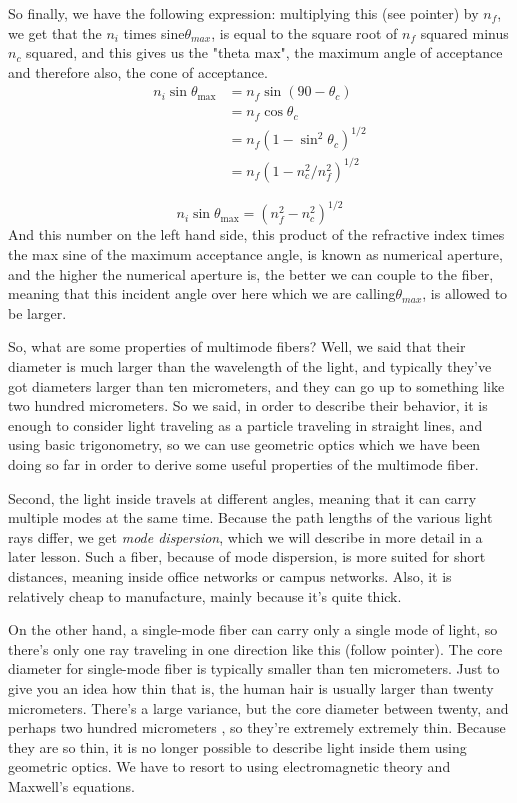 So finally, we have the following expression: multiplying this (see pointer) by $n_f$, we get that the $n_i$ times sine$\theta_{max}$, is equal to the square root of $n_f$ squared minus $n_c$ squared, and this gives us the "theta max", the maximum angle of acceptance and therefore also, the cone of acceptance.
\begin{equation}
\begin{aligned}
n_i \sin \theta_{\max } &=n_f \sin \left(90-\theta_c\right) \\
&=n_f \cos \theta_c \\
&=n_f\left(1-\sin ^2 \theta_c\right)^{1 / 2} \\
&=n_f\left(1-n_c^2 / n_f^2\right)^{1 / 2}
\end{aligned}
\end{equation}

\begin{equation}
n_i \sin \theta_{\max }=\left(n_f^2-n_c^2\right)^{1 / 2}
\end{equation}
And this number on the left hand side, this product of the refractive index times the max sine of the maximum acceptance angle, is known as numerical aperture, and the higher the numerical aperture is, the better we can couple to the fiber, meaning that this incident angle over here which we are calling$\theta_{max}$, is allowed to be larger.

So, what are some properties of multimode fibers? Well, we said that their diameter is much larger than the wavelength of the light, and typically they've got diameters larger than ten micrometers, and they can go up to something like two hundred micrometers. So we said, in order to describe their behavior, it is enough to consider light traveling as a particle traveling in straight lines, and using basic trigonometry, so we can use geometric optics which we have been doing so far in order to derive some useful properties of the multimode fiber.

Second, the light inside travels at different angles, meaning that it can carry multiple modes at the same time. Because the path lengths of the various light rays differ, we get \emph{mode dispersion}, which we will describe in more detail in a later lesson. Such a fiber, because of mode dispersion, is more suited for short distances, meaning inside office networks or campus networks. Also, it is relatively cheap to manufacture, mainly because it's quite thick. 

On the other hand, a single-mode fiber can carry only a single mode of light, so there's only one ray traveling in one direction like this (follow pointer). The core diameter for single-mode fiber is typically smaller than ten micrometers. Just to give you an idea how thin that is, the human hair is usually larger than twenty micrometers. There's a large variance, but the core diameter between twenty, and perhaps two hundred micrometers , so they're extremely extremely thin. Because they are so thin, it is no longer possible to describe light inside them using geometric optics. We have to resort to using electromagnetic theory and Maxwell's equations.

